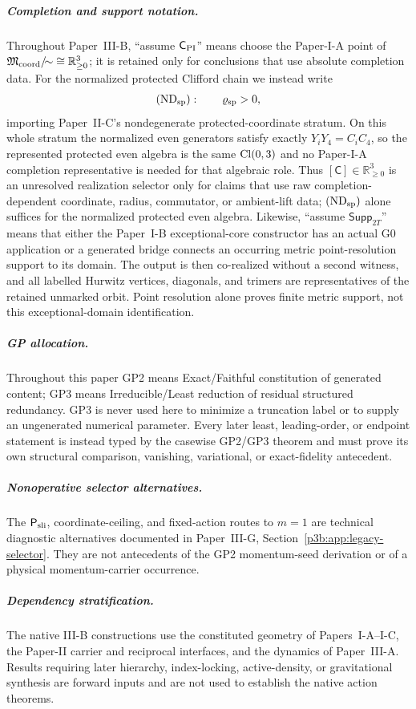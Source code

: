 \documentclass[12pt,a4paper]{article}
\begin{document}
\subparagraph{Completion and support notation.}
Throughout Paper~III-B, ``assume \(\mathsf C_{\rm PI}\)'' means choose the
Paper-I-A point of
\(\mathfrak M_{\rm coord}/\!{\sim}\cong\mathbb R_{\ge0}^3\); it is retained
only for conclusions that use absolute completion data.  For the normalized
protected Clifford chain we instead write
\[
 (\mathrm{ND}_{\rm sp}):\qquad \varrho_{\rm sp}>0,
\]
importing Paper~II-C's nondegenerate protected-coordinate stratum.  On this
whole stratum the normalized even generators satisfy exactly
\(Y_iY_4=C_iC_4\), so the represented protected even algebra is the same
\(\operatorname{Cl}(0,3)\) and no Paper-I-A completion representative is needed for that
algebraic role.  Thus \([\mathsf C]\in\mathbb R_{\ge0}^3\) is an unresolved
realization selector only for claims that use raw completion-dependent
coordinate, radius, commutator, or ambient-lift data; \((\mathrm{ND}_{\rm sp})\)
alone suffices for the normalized protected even algebra.  Likewise, ``assume
\(\mathsf{Supp}_{2T}\)'' means that
either the Paper~I-B exceptional-core constructor has an actual G0 application
or a generated bridge connects an occurring metric point-resolution support
to its domain.  The output is then co-realized without a second witness, and
all labelled Hurwitz vertices, diagonals, and trimers are representatives of
the retained unmarked orbit.  Point resolution alone proves finite metric
support, not this exceptional-domain identification.

\subparagraph{GP allocation.}
Throughout this paper GP2 means Exact/Faithful constitution of generated
content; GP3 means Irreducible/Least reduction of residual structured
redundancy.  GP3 is never used here to minimize a truncation label or to
supply an ungenerated numerical parameter.  Every later least, leading-order,
or endpoint statement is instead typed by the casewise GP2/GP3 theorem and
must prove its own structural comparison, vanishing, variational, or
exact-fidelity antecedent.

\subparagraph{Nonoperative selector alternatives.}
The \(\mathsf P_{\rm sli}\), coordinate-ceiling, and fixed-action
routes to \(m=1\) are technical diagnostic alternatives documented in
Paper~III-G, Section~\ref{p3b:app:legacy-selector}.  They are not antecedents of the
GP2 momentum-seed derivation or of a physical momentum-carrier occurrence.

\subparagraph{Dependency stratification.}
The native III-B constructions use the constituted geometry of Papers~I-A--I-C,
the Paper-II carrier and reciprocal interfaces, and the dynamics of Paper~III-A.
Results requiring later hierarchy, index-locking, active-density, or gravitational
synthesis are forward inputs and are not used to establish the native action theorems.
\end{document}
